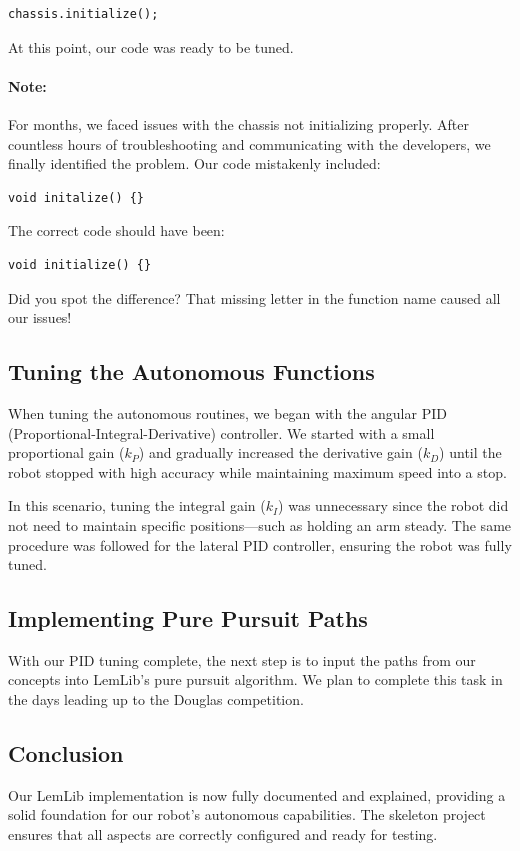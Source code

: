 \begin{verbatim}
chassis.initialize();
\end{verbatim}

At this point, our code was ready to be tuned.  

\paragraph{Note:}  
For months, we faced issues with the chassis not initializing properly. After countless hours of troubleshooting and communicating with the developers, we finally identified the problem. Our code mistakenly included:  

\begin{verbatim}
void initalize() {}
\end{verbatim}

The correct code should have been:  

\begin{verbatim}
void initialize() {}
\end{verbatim}

Did you spot the difference? That missing letter in the function name caused all our issues!  

\subsection*{Tuning the Autonomous Functions}  
When tuning the autonomous routines, we began with the angular PID (Proportional-Integral-Derivative) controller. We started with a small proportional gain ($k_P$) and gradually increased the derivative gain ($k_D$) until the robot stopped with high accuracy while maintaining maximum speed into a stop.  

In this scenario, tuning the integral gain ($k_I$) was unnecessary since the robot did not need to maintain specific positions—such as holding an arm steady. The same procedure was followed for the lateral PID controller, ensuring the robot was fully tuned.  

\subsection*{Implementing Pure Pursuit Paths}  
With our PID tuning complete, the next step is to input the paths from our concepts into LemLib’s pure pursuit algorithm. We plan to complete this task in the days leading up to the Douglas competition.  

\subsection*{Conclusion}  
Our LemLib implementation is now fully documented and explained, providing a solid foundation for our robot’s autonomous capabilities. The skeleton project ensures that all aspects are correctly configured and ready for testing.



